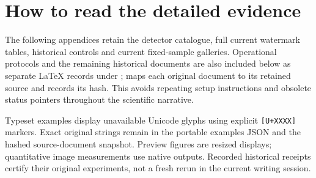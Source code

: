 \section{How to read the detailed evidence}
The following appendices retain the detector catalogue, full current watermark tables, historical controls and current fixed-sample galleries. Operational protocols and the remaining historical documents are also included below as separate LaTeX records under ;  maps each original document to its retained source and records its hash. This avoids repeating setup instructions and obsolete status pointers throughout the scientific narrative.

Typeset examples display unavailable Unicode glyphs using explicit \texttt{[U+XXXX]} markers. Exact original strings remain in the portable examples JSON and the hashed source-document snapshot. Preview figures are resized displays; quantitative image measurements use native outputs. Recorded historical receipts certify their original experiments, not a fresh rerun in the current writing session.
\clearpage

\clearpage

\clearpage

\clearpage

\clearpage

\clearpage

\clearpage

\clearpage
